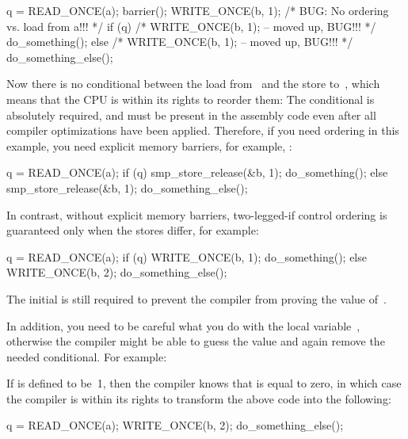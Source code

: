 \begin{VerbatimU}
	q = READ_ONCE(a);
	barrier();
	WRITE_ONCE(b, 1);  /* BUG: No ordering vs. load from a!!! */
	if (q) {
		/* WRITE_ONCE(b, 1); -- moved up, BUG!!! */
		do_something();
	} else {
		/* WRITE_ONCE(b, 1); -- moved up, BUG!!! */
		do_something_else();
	}
\end{VerbatimU}

Now there is no conditional between the load from~ and the store
to~, which means that the CPU is within its rights to reorder them:
The conditional is absolutely required, and must be present in the
assembly code even after all compiler optimizations have been applied.
Therefore, if you need ordering in this example, you need explicit
memory barriers, for example, :

\begin{VerbatimU}
	q = READ_ONCE(a);
	if (q) {
		smp_store_release(&b, 1);
		do_something();
	} else {
		smp_store_release(&b, 1);
		do_something_else();
	}
\end{VerbatimU}

In contrast, without explicit memory barriers, two-legged-if control
ordering is guaranteed only when the stores differ, for example:

\begin{VerbatimU}
	q = READ_ONCE(a);
	if (q) {
		WRITE_ONCE(b, 1);
		do_something();
	} else {
		WRITE_ONCE(b, 2);
		do_something_else();
	}
\end{VerbatimU}

The initial  is still required to prevent the compiler from
proving the value of~.

In addition, you need to be careful what you do with the local variable~,
otherwise the compiler might be able to guess the value and again remove
the needed conditional.  For example:


If  is defined to be~1, then the compiler knows that  is
equal to zero, in which case the compiler is within its rights to
transform the above code into the following:

\begin{VerbatimU}
	q = READ_ONCE(a);
	WRITE_ONCE(b, 2);
	do_something_else();
\end{VerbatimU}

